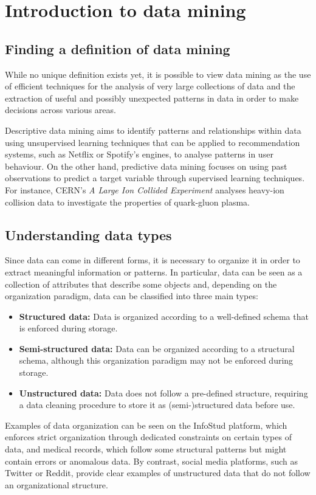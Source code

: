 \documentclass{report}
\begin{document}
\tableofcontents

\chapter{Introduction to data mining}
\section{Finding a definition of data mining}
While no unique definition exists yet, it is possible to view data mining as the use of efficient techniques for the analysis of very large collections of data and the extraction of useful and possibly unexpected patterns in data in order to make decisions across various areas.
\begin{examplebox}
    Descriptive data mining aims to identify patterns and relationships within data using unsupervised learning techniques that can be applied to recommendation systems, such as Netflix or Spotify's engines, to analyse patterns in user behaviour. \newline
    On the other hand, predictive data mining focuses on using past observations to predict a target variable through supervised learning techniques. \newline
    For instance, CERN's \textit{A Large Ion Collided Experiment} analyses heavy-ion collision data to investigate the properties of quark-gluon plasma.
\end{examplebox}
\section{Understanding data types}
Since data can come in different forms, it is necessary to organize it in order to extract meaningful information or patterns. \newline
In particular, data can be seen as a collection of attributes that describe some objects and, depending on the organization paradigm, data can be classified into three main types:
\begin{itemize}
    \item \textbf{Structured data: }Data is organized according to a well-defined schema that is enforced during storage.
    \item \textbf{Semi-structured data: }Data can be organized according to a structural schema, although this organization paradigm may not be enforced during storage.
    \item \textbf{Unstructured data: }Data does not follow a pre-defined structure, requiring a data cleaning procedure to store it as (semi-)structured data before use.
\end{itemize}
\begin{examplebox}
    Examples of data organization can be seen on the InfoStud platform, which enforces strict organization through dedicated constraints on certain types of data, and medical records, which follow some structural patterns but might contain errors or anomalous data. \newline
    By contrast, social media platforms, such as Twitter or Reddit, provide clear examples of unstructured data that do not follow an organizational structure.
\end{examplebox}
\end{document}
